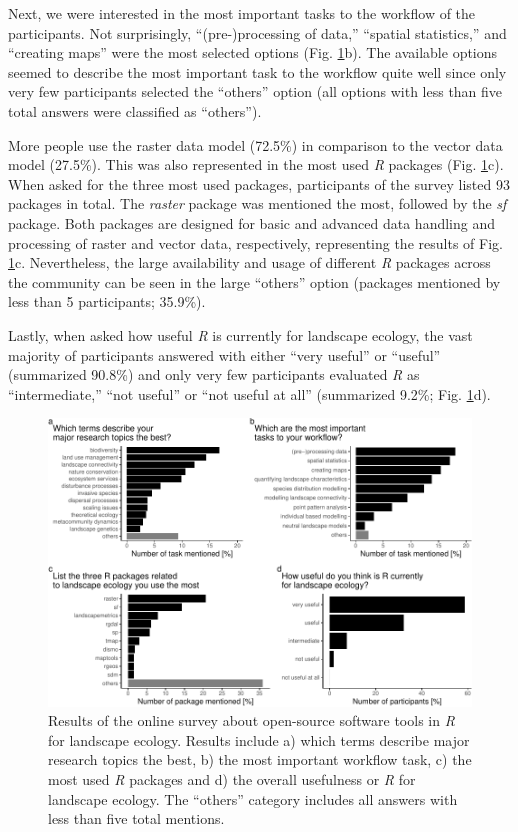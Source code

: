 \documentclass[smallextended]{svjour3}       %
\begin{document}
Next, we were interested in the most important tasks to the workflow of the participants.
Not surprisingly, ``(pre-)processing of data,'' ``spatial statistics,'' and ``creating maps'' were the most selected options (Fig. \ref{fig:fig-survey}b).
The available options seemed to describe the most important task to the workflow quite well since only very few participants selected the ``others'' option (all options with less than five total answers were classified as ``others'').

More people use the raster data model (72.5\%) in comparison to the vector data model (27.5\%).
This was also represented in the most used \textit{R} packages (Fig. \ref{fig:fig-survey}c).
When asked for the three most used packages, participants of the survey listed 93 packages in total.
The \textit{raster} package was mentioned the most, followed by the \textit{sf} package.
Both packages are designed for basic and advanced data handling and processing of raster and vector data, respectively, representing the results of Fig. \ref{fig:fig-survey}c.
Nevertheless, the large availability and usage of different \textit{R} packages across the community can be seen in the large ``others'' option (packages mentioned by less than 5 participants; 35.9\%).

Lastly, when asked how useful \textit{R} is currently for landscape ecology, the vast majority of participants answered with either ``very useful'' or ``useful'' (summarized 90.8\%) and only very few participants evaluated \textit{R} as ``intermediate,'' ``not useful'' or ``not useful at all'' (summarized 9.2\%; Fig. \ref{fig:fig-survey}d).



\begin{figure}

{\centering \includegraphics[width=\textwidth]{paper_files/figure-latex/fig-survey-1} 

}

\caption{Results of the online survey about open-source software tools in \textit{R} for landscape ecology. Results include a) which terms describe major research topics the best, b) the most important workflow task, c) the most used \textit{R} packages and d) the overall usefulness or \textit{R} for landscape ecology. The ``others'' category includes all answers with less than five total mentions.}\label{fig:fig-survey}
\end{figure}
\end{document}

